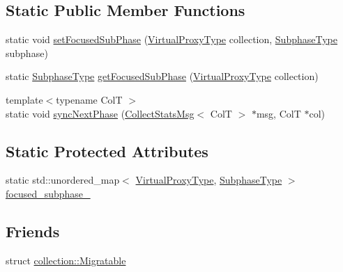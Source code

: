 \subsection*{Static Public Member Functions}
\begin{DoxyCompactItemize}
\item 
static void \hyperlink{structvt_1_1vrt_1_1collection_1_1balance_1_1_collection_l_b_data_aa755c5e50184c714ff8c868df7a8656f}{set\+Focused\+Sub\+Phase} (\hyperlink{namespacevt_a1b417dd5d684f045bb58a0ede70045ac}{Virtual\+Proxy\+Type} collection, \hyperlink{namespacevt_ae78cbfdf1e57470e33eedb074f2beeba}{Subphase\+Type} subphase)
\item 
static \hyperlink{namespacevt_ae78cbfdf1e57470e33eedb074f2beeba}{Subphase\+Type} \hyperlink{structvt_1_1vrt_1_1collection_1_1balance_1_1_collection_l_b_data_a2c2e1fdd16228e1c4513f0b18bfa7bc6}{get\+Focused\+Sub\+Phase} (\hyperlink{namespacevt_a1b417dd5d684f045bb58a0ede70045ac}{Virtual\+Proxy\+Type} collection)
\item 
{\footnotesize template$<$typename ColT $>$ }\\static void \hyperlink{structvt_1_1vrt_1_1collection_1_1balance_1_1_collection_l_b_data_a64ad9ae121a8375a323bc339bf421c33}{sync\+Next\+Phase} (\hyperlink{structvt_1_1vrt_1_1collection_1_1balance_1_1_collect_stats_msg}{Collect\+Stats\+Msg}$<$ ColT $>$ $\ast$msg, ColT $\ast$col)
\end{DoxyCompactItemize}
\subsection*{Static Protected Attributes}
\begin{DoxyCompactItemize}
\item 
static std\+::unordered\+\_\+map$<$ \hyperlink{namespacevt_a1b417dd5d684f045bb58a0ede70045ac}{Virtual\+Proxy\+Type}, \hyperlink{namespacevt_ae78cbfdf1e57470e33eedb074f2beeba}{Subphase\+Type} $>$ \hyperlink{structvt_1_1vrt_1_1collection_1_1balance_1_1_collection_l_b_data_a0970caec5bb5092d90d81c95736369b4}{focused\+\_\+subphase\+\_\+}
\end{DoxyCompactItemize}
\subsection*{Friends}
\begin{DoxyCompactItemize}
\item 
struct \hyperlink{structvt_1_1vrt_1_1collection_1_1balance_1_1_collection_l_b_data_ad16bcfc5db0df5769bebcb8888c723d0}{collection\+::\+Migratable}
\end{DoxyCompactItemize}
